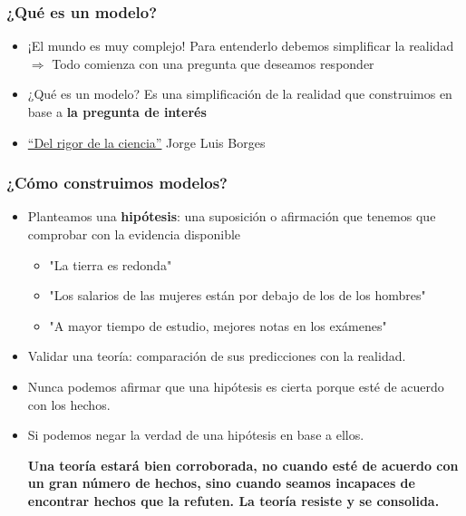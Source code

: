 \documentclass{beamer}
\begin{document}
\begin{frame}
\frametitle{¿Qué es un modelo?}
\begin{itemize}
    \item ¡El mundo es muy complejo! Para entenderlo debemos simplificar la realidad \vspace{2mm} \\ $\Rightarrow$
    Todo comienza con una pregunta que deseamos responder \vspace{2mm}
    \item ¿Qué es un modelo? Es una simplificación de la realidad que construimos en base a \textbf{la pregunta de interés}  \vspace{2mm}
    \item  \href{https://www.youtube.com/watch?v=zwDA3GmcwJU}{``Del rigor de la ciencia''} 
    Jorge Luis Borges
\end{itemize}
\end{frame}

\begin{frame}
\frametitle{¿Cómo construimos modelos?}
    \begin{itemize}
        \item Planteamos una \textbf{hipótesis}: una suposición o afirmación que tenemos que comprobar con la evidencia disponible
        \begin{itemize}
        \item "La tierra es redonda"
        \item "Los salarios de las mujeres están por debajo de los de los hombres"
        \item "A mayor tiempo de estudio, mejores notas en los exámenes"
        \end{itemize}
        \item Validar una teoría: comparación de sus predicciones con la realidad.
        \item Nunca podemos afirmar que una hipótesis es cierta porque esté de acuerdo con los hechos.
        \item Si podemos negar la verdad de una hipótesis en base a ellos.
        \begin{center}
            \begin{boxA}
                \textbf{Una teoría estará bien corroborada, no cuando esté de acuerdo con un gran número de hechos, sino cuando seamos incapaces de encontrar hechos que la refuten. La teoría resiste y se consolida.}
            \end{boxA}
        \end{center}
    \end{itemize}
\end{frame}
\end{document}
